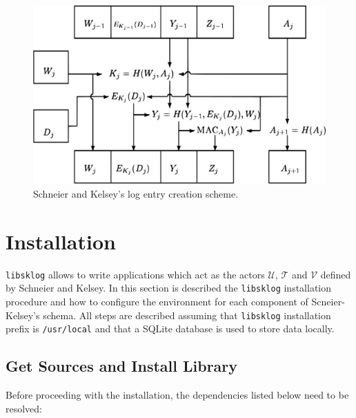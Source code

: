 \documentclass[a4paper,12pt]{article}
\def\libsklog{\texttt{libsklog}\xspace}
\def\u{$\mathcal{U}$\xspace}
\def\t{$\mathcal{T}$\xspace}
\def\v{$\mathcal{V}$\xspace}
\begin{document}
\begin{figure}[h!]
\begin{center}
\includegraphics[scale=0.4]{images/sk-logentry-gen}
\caption{Schneier and Kelsey's log entry creation scheme.}
\label{fig:sk}
\end{center}
\end{figure}


\section{Installation}

\libsklog allows to write applications which act as the actors \u, \t
and \v defined by Schneier and Kelsey. In this section is described
the \libsklog installation procedure and how to configure the
environment for each component of Scneier-Kelsey's schema.
All steps are described assuming that \libsklog installation
prefix is \texttt{/usr/local} and that a SQLite database is used to store
data locally.


\subsection{Get Sources and Install Library}

Before proceeding with the installation, the dependencies listed below
need to be resolved:
\end{document}
